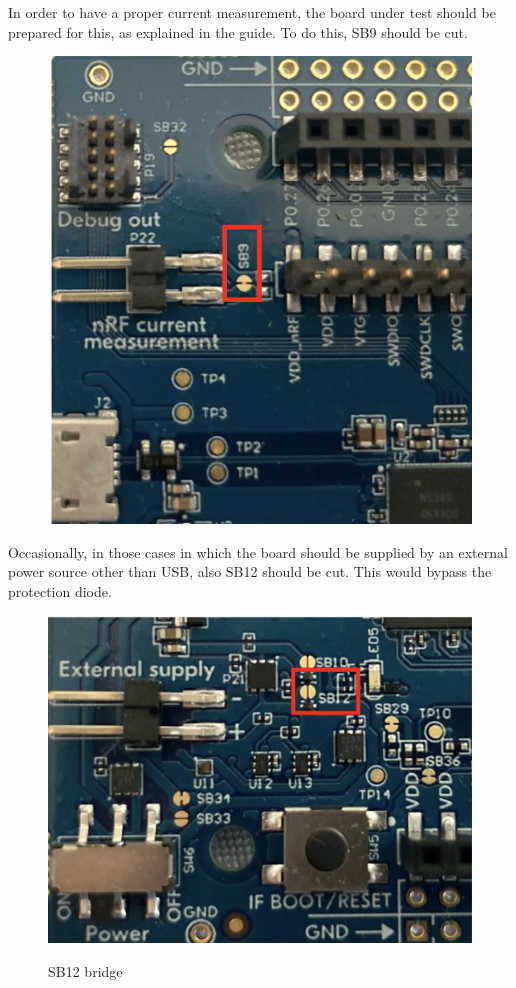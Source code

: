 \documentclass{Configuration_Files/PoliMi3i_thesis}
\begin{document}
In order to have a proper current measurement, the board under test should be prepared for this, as explained in the guide.
To do this, SB9 should be cut.

\begin{figure}[H]
    \centering
    \includegraphics[scale=0.6]{Test_Procedure/15.png}
    \label{direct_communication_board_PC_15}
\end{figure}

Occasionally, in those cases in which the board should be supplied by an external power source other than USB, also SB12 should be cut. This would bypass the protection diode.

\begin{figure}[H]
    \centering
    \includegraphics[scale=0.6]{Test_Procedure/16.png}
    \label{direct_communication_board_PC_16}
    \caption{SB12 bridge}
\end{figure}
\end{document}
